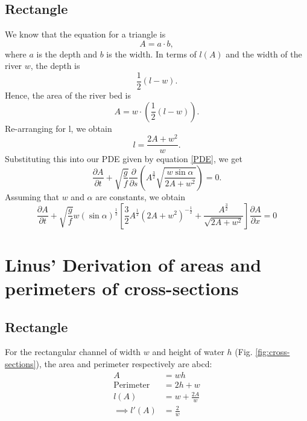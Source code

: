 \documentclass[12pt]{article}
\begin{document}
\subsection{Rectangle}
We know that the equation for a triangle is
\begin{equation}
    A = a \cdot b,
\end{equation}
where $a$ is the depth and $b$ is the width.  In terms of $l(A)$ and the width of the river $w$, the depth is
\begin{equation}
    \frac{1}{2}(l-w).
\end{equation}
Hence, the area of the river bed is
\begin{equation}
    A=w\cdot \left(\frac{1}{2}(l-w)\right).
\end{equation}
Re-arranging for l, we obtain
\begin{equation}
    l = \frac{2A+w^2}{w}.
\end{equation}
Substituting this into our PDE given by equation \ref{PDE}, we get
\begin{equation}
    \frac{\partial A}{\partial t} + \sqrt{\frac{g}{f}}\frac{\partial}{\partial s}\left(A^{\frac{3}{2}}\sqrt{\frac{w\sin\alpha}{2A+w^2}}\right) = 0.
\end{equation}
Assuming that $w$ and $\alpha$ are constants, we obtain
\begin{equation}
    \frac{\partial A}{\partial t} + \sqrt{\frac{g}{f}}w(\sin\alpha)^{\frac{1}{2}}\left[\frac{3}{2}A^{\frac{1}{2}}(2A+w^2)^{-\frac{1}{2}}+ \frac{A^{\frac{3}{2}}}{\sqrt{2A+w^2}}\right] \frac{\partial A}{\partial x} = 0
\end{equation}

\section{Linus' Derivation of areas and perimeters of cross-sections}
\subsection{Rectangle}
For the rectangular channel of width $w$ and height of water $h$ (Fig. \ref{fig:cross-sections}), the area and perimeter respectively are abcd:
\begin{equation}
    \begin{split}
        A &= wh
        \\\text{Perimeter}&=2h + w
        \\l(A) &= w + \frac{2A}{w}
        \\\implies l'(A) &= \frac{2}{w}
    \end{split}
\end{equation}
\end{document}

